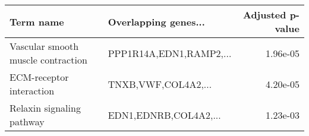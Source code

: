 \begin{tabular}{llr}
\toprule
                         Term name &    Overlapping genes... &  Adjusted p-value \\
\midrule
Vascular smooth muscle contraction & PPP1R14A,EDN1,RAMP2,... &          1.96e-05 \\
          ECM-receptor interaction &     TNXB,VWF,COL4A2,... &          4.20e-05 \\
         Relaxin signaling pathway &   EDN1,EDNRB,COL4A2,... &          1.23e-03 \\
\bottomrule
\end{tabular}
